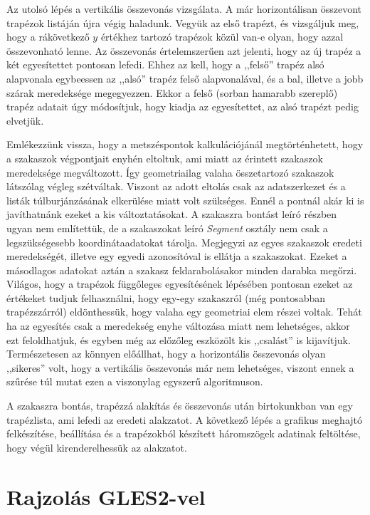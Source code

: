 \documentclass[12pt]{report}
\theoremstyle{definition}
\newcommand{\func}[1]{{\textsl{#1}}}
\begin{document}
Az utolsó lépés a vertikális összevonás vizsgálata. A már horizontálisan
összevont trapézok listáján újra végig haladunk. Vegyük az első trapézt, és
vizsgáljuk meg, hogy a rákövetkező $y$ értékhez tartozó trapézok közül van-e
olyan, hogy azzal összevonható lenne. Az összevonás értelemszerűen azt jelenti,
hogy az új trapéz a két egyesítettet pontosan lefedi. Ehhez az kell, hogy a
,,felső'' trapéz alsó alapvonala egybeessen az ,,alsó'' trapéz felső
alapvonalával, és a bal, illetve a jobb szárak meredeksége megegyezzen. Ekkor a
felső (sorban hamarabb szereplő) trapéz adatait úgy módosítjuk, hogy kiadja az
egyesítettet, az alsó trapézt pedig elvetjük.

Emlékezzünk vissza, hogy a metszéspontok kalkulációjánál megtörténhetett, hogy
a szakaszok végpontjait enyhén eltoltuk, ami miatt az érintett szakaszok
meredeksége megváltozott. Így geometriailag valaha összetartozó szakaszok
látszólag végleg szétváltak. Viszont az adott eltolás csak az adatszerkezet és
a listák túlburjánzásának elkerülése miatt volt szükséges. Ennél a pontnál akár
ki is javíthatnánk ezeket a kis változtatásokat. A szakaszra bontást leíró
részben ugyan nem említettük, de a szakaszokat leíró \func{Segment} osztály nem
csak a legszükségesebb koordinátaadatokat tárolja. Megjegyzi az egyes szakaszok
eredeti meredekségét, illetve egy egyedi azonosítóval is ellátja a szakaszokat.
Ezeket a másodlagos adatokat aztán a szakasz feldarabolásakor minden darabka
megőrzi. Világos, hogy a trapézok függőleges egyesítésének lépésében pontosan
ezeket az értékeket tudjuk felhasználni, hogy egy-egy szakaszról (még
pontosabban trapézszárról) eldönthessük, hogy valaha egy geometriai elem részei
voltak. Tehát ha az egyesítés csak a meredekség enyhe változása miatt nem
lehetséges, akkor ezt feloldhatjuk, és egyben még az előzőleg eszközölt kis
,,csalást'' is kijavítjuk. Természetesen az könnyen előállhat, hogy a
horizontális összevonás olyan ,,sikeres'' volt, hogy a vertikális összevonás
már nem lehetséges, viszont ennek a szűrése túl mutat ezen a viszonylag
egyszerű algoritmuson.

A szakaszra bontás, trapézzá alakítás és összevonás után birtokunkban van egy
trapézlista, ami lefedi az eredeti alakzatot. A következő lépés a grafikus
meghajtó felkészítése, beállítása és a trapézokból készített háromszögek
adatinak feltöltése, hogy végül kirenderelhessük az alakzatot.

  \section{Rajzolás GLES2-vel}
\end{document}
